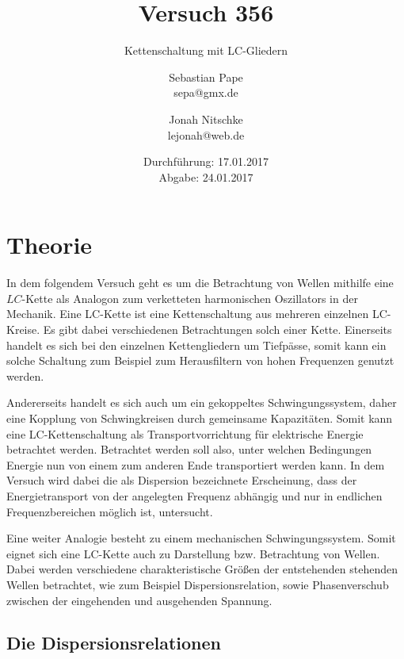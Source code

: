 

\title{Versuch 356}
\subtitle{Kettenschaltung mit LC-Gliedern}
\author{Sebastian Pape\\
        sepa@gmx.de \and
        Jonah Nitschke\\
        lejonah@web.de}
\date{Durchführung: 17.01.2017\\
      Abgabe: 24.01.2017}


\maketitle

\section{Theorie}

In dem folgendem Versuch geht es um die Betrachtung von Wellen mithilfe eine
$LC$-Kette als Analogon zum verketteten harmonischen Oszillators in der
Mechanik. Eine LC-Kette ist eine Kettenschaltung aus mehreren einzelnen LC-Kreise.
Es gibt dabei verschiedenen Betrachtungen solch einer Kette. Einerseits handelt es
sich bei den einzelnen Kettengliedern um Tiefpässe, somit kann ein solche Schaltung
zum Beispiel zum Herausfiltern von hohen Frequenzen genutzt werden.

Andererseits handelt es sich auch um ein gekoppeltes Schwingungssystem, daher eine
Kopplung von Schwingkreisen durch gemeinsame Kapazitäten. Somit kann eine
LC-Kettenschaltung als Transportvorrichtung für elektrische Energie betrachtet werden.
Betrachtet werden soll also, unter welchen Bedingungen Energie nun von einem
zum anderen Ende transportiert werden kann. In dem Versuch wird dabei die als
Dispersion bezeichnete Erscheinung, dass der Energietransport von der angelegten
Frequenz abhängig und nur in endlichen Frequenzbereichen möglich ist, untersucht.

Eine weiter Analogie besteht zu einem mechanischen Schwingungssystem. Somit eignet
sich eine LC-Kette auch zu Darstellung bzw. Betrachtung von Wellen. Dabei werden
verschiedene charakteristische Größen der entstehenden stehenden Wellen betrachtet,
wie zum Beispiel Dispersionsrelation, sowie Phasenverschub zwischen der eingehenden
und ausgehenden Spannung.

\subsection{Die Dispersionsrelationen}

